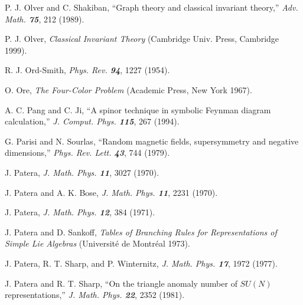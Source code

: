 

 P. J. Olver and C. Shakiban,
``Graph theory and classical invariant theory,''
{\em Adv. Math. \bf 75}, 212 (1989). %

 P. J. Olver,
{\em Classical Invariant Theory}
(Cambridge Univ. Press, Cambridge 1999).

R. J. Ord-Smith,
{\em Phys.  Rev. \bf 94}, 1227 (1954).

O. Ore,
{\em The Four-Color Problem}
(Academic Press, New York 1967).


A. C. Pang and C. Ji,
``A spinor technique in symbolic Feynman diagram calculation,''
{\em J.  Comput.  Phys.    \bf 115}, 267 (1994).


G. Parisi and N. Sourlas,
``Random magnetic fields, supersymmetry and negative dimensions,''
{\em Phys.  Rev.  Lett.    \bf 43}, 744 (1979).

J. Patera,
{\em J. Math. Phys.  \bf 11}, 3027 (1970).

J. Patera and A. K. Bose,
{\em J. Math. Phys.  \bf 11}, 2231 (1970).

 J. Patera,
{\em J. Math. Phys.  \bf 12}, 384 (1971).

 J. Patera and D. Sankoff,
{\em Tables of Branching Rules for Representations of Simple Lie Algebras}
(Universit{\'e} de Montr{\'e}al 1973).

J. Patera, R. T. Sharp, and P. Winternitz,
{\em J. Math. Phys.  \bf 17}, 1972 (1977).

J. Patera and R. T. Sharp,
``On the triangle anomaly number of $SU(N)$ representations,''
{\em J.  Math.  Phys.    \bf 22}, 2352 (1981).

